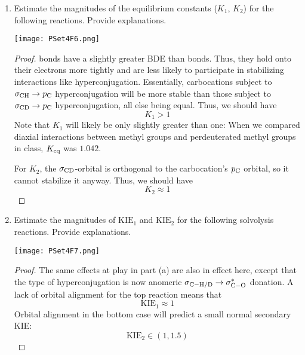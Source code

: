 \documentclass[../psets.tex]{subfiles}
\begin{document}
\begin{enumerate}
    \begin{enumerate}
        \item Estimate the magnitudes of the equilibrium constants ($K_1$, $K_2$) for the following reactions. Provide explanations.
        \begin{center}
            \texttt{[image: PSet4F6.png]}
        \end{center}
        \begin{proof}
             bonds have a slightly greater BDE than  bonds. Thus, they hold onto their electrons more tightly and are less likely to participate in stabilizing interactions like hyperconjugation. Essentially, carbocations subject to $\sigma_{\ce{CH}}\to p_{\ce{C}}$ hyperconjugation will be more stable than those subject to $\sigma_{\ce{CD}}\to p_{\ce{C}}$ hyperconjugation, all else being equal. Thus, we should have
            \begin{equation*}
                \boxed{K_1 > 1}
            \end{equation*}
            Note that $K_1$ will likely be only slightly greater than one: When we compared diaxial interactions between methyl groups and perdeuterated methyl groups in class, $K_\textup{eq}$ was $1.042$.\par
            For $K_2$, the $\sigma_{\ce{CD}}$-orbital is orthogonal to the carbocation's $p_{\ce{C}}$ orbital, so it cannot stabilize it anyway. Thus, we should have
            \begin{equation*}
                \boxed{K_2 \approx 1}
            \end{equation*}
        \end{proof}
        \item Estimate the magnitudes of $\text{KIE}_1$ and $\text{KIE}_2$ for the following solvolysis reactions. Provide explanations.
        \begin{center}
            \texttt{[image: PSet4F7.png]}
        \end{center}
        \begin{proof}
            The same effects at play in part (a) are also in effect here, except that the type of hyperconjugation is now anomeric $\sigma_{\ce{C-H/D}}\to\sigma^*_{\ce{C-O}}$ donation. A lack of orbital alignment for the top reaction means that
            \begin{equation*}
                \boxed{\text{KIE}_1 \approx 1}
            \end{equation*}
            Orbital alignment in the bottom case will predict a small normal secondary KIE:
            \begin{equation*}
                \boxed{\text{KIE}_2 \in (1,1.5)}
            \end{equation*}
        \end{proof}
    \end{enumerate}
\end{enumerate}
\end{document}

